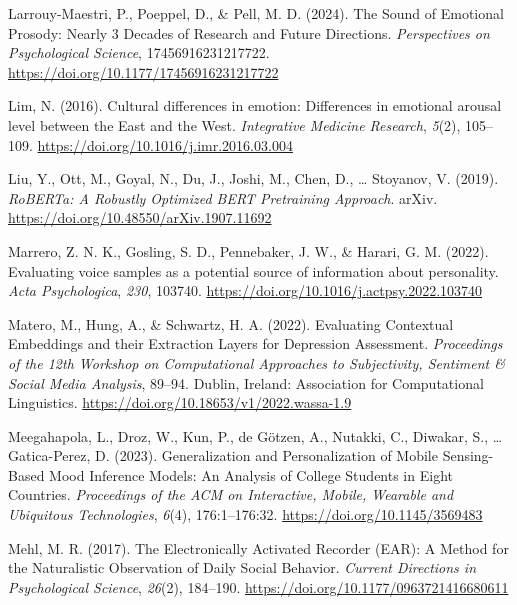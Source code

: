 \documentclass[
  english,
  man,floatsintext]{apa6}
\newlength{\cslhangindent}
\newenvironment{CSLReferences}[2] %
 {%
  \setlength{\parindent}{0pt}
  \ifodd #1 \everypar{\setlength{\hangindent}{\cslhangindent}}\ignorespaces\fi
  \ifnum #2 > 0
  \setlength{\parskip}{#2\baselineskip}
  \fi
 }%
 {}
\begin{document}
\begin{CSLReferences}{1}{0}
\leavevmode{}%
Larrouy-Maestri, P., Poeppel, D., \& Pell, M. D. (2024). The {Sound} of {Emotional Prosody}: {Nearly} 3 {Decades} of {Research} and {Future Directions}. \emph{Perspectives on Psychological Science}, 17456916231217722. \url{https://doi.org/10.1177/17456916231217722}

\leavevmode{}%
Lim, N. (2016). Cultural differences in emotion: Differences in emotional arousal level between the {East} and the {West}. \emph{Integrative Medicine Research}, \emph{5}(2), 105--109. \url{https://doi.org/10.1016/j.imr.2016.03.004}

\leavevmode{}%
Liu, Y., Ott, M., Goyal, N., Du, J., Joshi, M., Chen, D., \ldots{} Stoyanov, V. (2019). \emph{{RoBERTa}: {A Robustly Optimized BERT Pretraining Approach}}. arXiv. \url{https://doi.org/10.48550/arXiv.1907.11692}

\leavevmode{}%
Marrero, Z. N. K., Gosling, S. D., Pennebaker, J. W., \& Harari, G. M. (2022). Evaluating voice samples as a potential source of information about personality. \emph{Acta Psychologica}, \emph{230}, 103740. \url{https://doi.org/10.1016/j.actpsy.2022.103740}

\leavevmode{}%
Matero, M., Hung, A., \& Schwartz, H. A. (2022). Evaluating {Contextual Embeddings} and their {Extraction Layers} for {Depression Assessment}. \emph{Proceedings of the 12th {Workshop} on {Computational Approaches} to {Subjectivity}, {Sentiment} \& {Social Media Analysis}}, 89--94. Dublin, Ireland: Association for Computational Linguistics. \url{https://doi.org/10.18653/v1/2022.wassa-1.9}

\leavevmode{}%
Meegahapola, L., Droz, W., Kun, P., de Götzen, A., Nutakki, C., Diwakar, S., \ldots{} Gatica-Perez, D. (2023). Generalization and {Personalization} of {Mobile Sensing-Based Mood Inference Models}: {An Analysis} of {College Students} in {Eight Countries}. \emph{Proceedings of the ACM on Interactive, Mobile, Wearable and Ubiquitous Technologies}, \emph{6}(4), 176:1--176:32. \url{https://doi.org/10.1145/3569483}

\leavevmode{}%
Mehl, M. R. (2017). The {Electronically Activated Recorder} ({EAR}): {A Method} for the {Naturalistic Observation} of {Daily Social Behavior}. \emph{Current Directions in Psychological Science}, \emph{26}(2), 184--190. \url{https://doi.org/10.1177/0963721416680611}


\end{CSLReferences}
\end{document}
